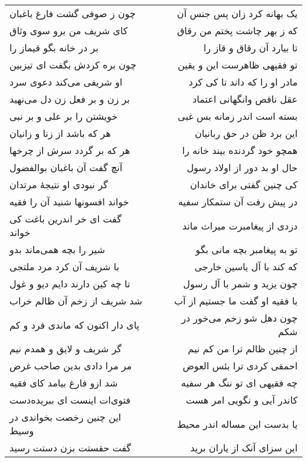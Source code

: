 \begin{center}
\begin{longtable}{l p{0.5cm} r}
چون ز صوفی گشت فارغ باغبان
&&
یک بهانه کرد زان پس جنس آن
\\
کای شریف من برو سوی وثاق
&&
که ز بهر چاشت پختم من رقاق
\\
بر در خانه بگو قیماز را
&&
تا بیارد آن رقاق و قاز را
\\
چون بره کردش بگفت ای تیزبین
&&
تو فقیهی ظاهرست این و یقین
\\
او شریفی می‌کند دعوی سرد
&&
مادر او را که داند تا کی کرد
\\
بر زن و بر فعل زن دل می‌نهید
&&
عقل ناقص وانگهانی اعتماد
\\
خویشتن را بر علی و بر نبی
&&
بسته است اندر زمانه بس غبی
\\
هر که باشد از زنا و زانیان
&&
این برد ظن در حق ربانیان
\\
هر که بر گردد سرش از چرخها
&&
همچو خود گردنده بیند خانه را
\\
آنچ گفت آن باغبان بوالفضول
&&
حال او بد دور از اولاد رسول
\\
گر نبودی او نتیجهٔ مرتدان
&&
کی چنین گفتی برای خاندان
\\
خواند افسونها شنید آن را فقیه
&&
در پیش رفت آن ستمکار سفیه
\\
گفت ای خر اندرین باغت کی خواند
&&
دزدی از پیغامبرت میراث ماند
\\
شیر را بچه همی‌ماند بدو
&&
تو به پیغامبر بچه مانی بگو
\\
با شریف آن کرد مرد ملتجی
&&
که کند با آل یاسین خارجی
\\
تا چه کین دارند دایم دیو و غول
&&
چون یزید و شمر با آل رسول
\\
شد شریف از زخم آن ظالم خراب
&&
با فقیه او گفت ما جستیم از آب
\\
پای دار اکنون که ماندی فرد و کم
&&
چون دهل شو زخم می‌خور در شکم
\\
گر شریف و لایق و همدم نیم
&&
از چنین ظالم ترا من کم نیم
\\
مر مرا دادی بدین صاحب غرض
&&
احمقی کردی ترا بئس العوض
\\
شد ازو فارغ بیامد کای فقیه
&&
چه فقیهی ای تو ننگ هر سفیه
\\
فتوی‌ات اینست ای ببریده‌دست
&&
کاندر آیی و نگویی امر هست
\\
این چنین رخصت بخواندی در وسیط
&&
یا بدست این مساله اندر محیط
\\
گفت حقستت بزن دستت رسید
&&
این سزای آنک از یاران برید
\\
\end{longtable}
\end{center}
